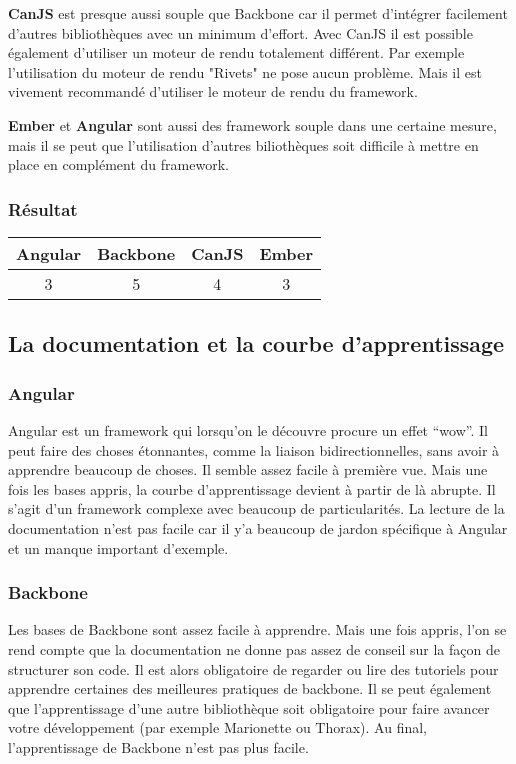 \textbf{CanJS} est presque aussi souple que Backbone car il permet d’intégrer facilement d’autres bibliothèques avec un minimum d’effort. Avec CanJS il est possible également d’utiliser un moteur de rendu totalement différent. Par exemple l’utilisation du moteur de rendu "Rivets" ne pose aucun problème. Mais il est vivement recommandé d’utiliser le moteur de rendu du framework.

\textbf{Ember} et \textbf{Angular} sont aussi des framework souple dans une certaine mesure, mais il se peut que l’utilisation d’autres biliothèques soit difficile à mettre en place en complément du framework.


\subsubsection{Résultat}
\begin{tabular}{|c|c|c|c|}
  \hline 
  Angular & Backbone & CanJS & Ember \\
  \hline 
  3 & 5 & 4 & 3 \\
  \hline
\end{tabular}


\subsection{La documentation et la courbe d'apprentissage}

\subsubsection{Angular}

Angular est un framework qui lorsqu’on le découvre procure un effet “wow”. Il peut faire des choses étonnantes, comme la liaison bidirectionnelles, sans avoir à apprendre beaucoup de choses. Il semble assez facile à première vue. Mais une fois les bases appris, la courbe d’apprentissage devient à partir de là abrupte. Il s’agit d’un framework complexe avec beaucoup de particularités. La lecture de la documentation n’est pas facile car il y’a beaucoup de jardon spécifique à Angular et un manque important d’exemple.

\subsubsection{Backbone}

Les bases de Backbone sont assez facile à apprendre. Mais une fois appris, l’on se rend compte que la documentation ne donne pas assez de conseil sur la façon de structurer son code. Il est alors obligatoire de regarder ou lire des tutoriels pour apprendre certaines des meilleures pratiques de backbone. Il se peut également que l’apprentissage d’une autre bibliothèque soit obligatoire pour faire avancer votre développement (par exemple Marionette ou Thorax). Au final, l’apprentissage de Backbone n’est pas plus facile.

